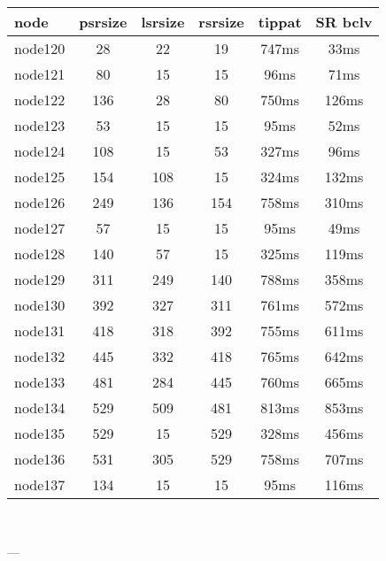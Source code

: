 \begin{tabular}{|l|c|c|c|c|c|}
\hline node & psrsize & lsrsize & rsrsize   & tippat & SR bclv\\
    \hline node120 & 28 & 22 & 19 & 747ms & 33ms\\
    \hline node121 & 80 & 15 & 15 & 96ms & 71ms\\
    \hline node122 & 136 & 28 & 80 & 750ms & 126ms\\
    \hline node123 & 53 & 15 & 15 & 95ms & 52ms\\
    \hline node124 & 108 & 15 & 53 & 327ms & 96ms\\
    \hline node125 & 154 & 108 & 15 & 324ms & 132ms\\
    \hline node126 & 249 & 136 & 154 & 758ms & 310ms\\
    \hline node127 & 57 & 15 & 15 & 95ms & 49ms\\
    \hline node128 & 140 & 57 & 15 & 325ms & 119ms\\
    \hline node129 & 311 & 249 & 140 & 788ms & 358ms\\
    \hline node130 & 392 & 327 & 311 & 761ms & 572ms\\
    \hline node131 & 418 & 318 & 392 & 755ms & 611ms\\
    \hline node132 & 445 & 332 & 418 & 765ms & 642ms\\
    \hline node133 & 481 & 284 & 445 & 760ms & 665ms\\
    \hline node134 & 529 & 509 & 481 & 813ms & 853ms\\
    \hline node135 & 529 & 15 & 529 & 328ms & 456ms\\
    \hline node136 & 531 & 305 & 529 & 758ms & 707ms\\
    \hline node137 & 134 & 15 & 15 & 95ms & 116ms\\

\hline
\end{tabular} \

---

